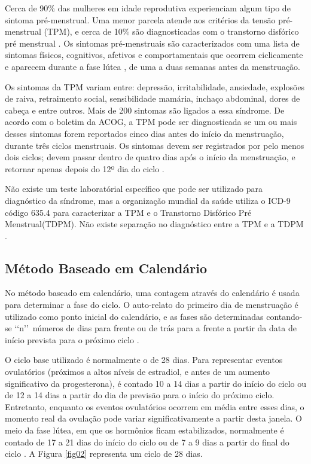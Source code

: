 Cerca de 90\% das mulheres em idade reprodutiva experienciam algum tipo de 
sintoma pré-menstrual. Uma menor parcela atende aos critérios da tensão 
pré-menstrual (TPM), e cerca de 10\% são diagnosticadas com o transtorno 
disfórico pré menstrual \cite{mishell2005}. Os sintomas pré-menstruais 
são caracterizados com uma lista de sintomas físicos, cognitivos, 
afetivos e comportamentais que ocorrem ciclicamente e aparecem durante a 
fase lútea \cite{obrien2011}, de uma a duas semanas antes da menstruação. 

Os sintomas da TPM variam entre: depressão, irritabilidade, ansiedade, 
explosões de raiva, retraimento social, sensibilidade mamária, 
inchaço abdominal, dores de cabeça e entre outros. Mais de 200 sintomas 
são ligados a essa síndrome. De acordo com o boletim da ACOG, a TPM pode 
ser diagnosticada se um ou mais desses sintomas forem reportados cinco dias 
antes do início da menstruação, durante três ciclos menstruais. Os sintomas 
devem ser registrados por pelo menos dois ciclos; devem passar dentro de 
quatro dias após o início da menstruação, e retornar apenas depois do 12º dia do 
ciclo \cite{ACOG2000}.

Não existe um teste laboratórial específico que pode ser utilizado para 
diagnóstico da síndrome, mas a organização mundial da saúde utiliza o ICD-9 
código 635.4 para caracterizar a TPM e o Transtorno Disfórico Pré Menstrual(TDPM). 
Não existe separação no diagnóstico entre a TPM e a TDPM \cite{biggs2011}.

\subsection{Método Baseado em Calendário}


No método baseado em calendário, uma contagem através do calendário é usada para determinar 
a fase do ciclo. O auto-relato do primeiro dia de menstruação é 
utilizado como ponto inicial do calendário, e as fases são determinadas 
contando-se \lq \lq n\rq \rq \ números de dias para frente ou de trás para 
a frente a partir da data de início prevista para o próximo ciclo \cite{wideman2013}.

O ciclo base utilizado é normalmente o de 28 dias. Para representar eventos
ovulatórios (próximos a altos níveis de estradiol, e antes de um aumento significativo da
progesterona), é contado 10 a 14 dias a partir do início do ciclo ou de 12 a 14 dias a partir do
dia de previsão para o início do próximo ciclo. Entretanto, enquanto os eventos ovulatórios ocorrem
em média entre esses dias, o momento real da ovulação pode variar significativamente
a partir desta janela. O meio da fase lútea, em que os hormônios ficam 
estabilizados, normalmente é contado de 17 a 21 dias do início do ciclo 
ou de 7 a 9 dias a partir do final do ciclo \cite{wideman2013}. 
A Figura \ref{fig02} representa um ciclo de 28 dias.

